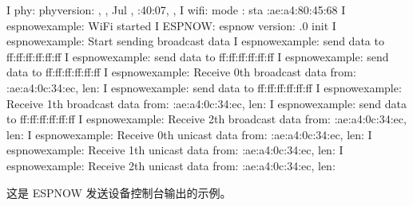 \documentclass[a4paper,12pt,english]{sphinxmanual}
\begin{document}
{{\begin{sphinxVerbatim}[commandchars=\\\{\}]
I  phy: phy\PYGZus{}version: , , Jul  , :40:07, , 
I  wifi: mode : sta :ae:a4:80:45:68
I  espnow\PYGZus{}example: WiFi started
I  ESPNOW: espnow \PYG{o}{[}version: .0\PYG{o}{]} init
I  espnow\PYGZus{}example: Start sending broadcast data
I  espnow\PYGZus{}example: send data to ff:ff:ff:ff:ff:ff
I  espnow\PYGZus{}example: send data to ff:ff:ff:ff:ff:ff
I  espnow\PYGZus{}example: send data to ff:ff:ff:ff:ff:ff
I  espnow\PYGZus{}example: Receive 0th broadcast data from: :ae:a4:0c:34:ec, len: 
I  espnow\PYGZus{}example: send data to ff:ff:ff:ff:ff:ff
I  espnow\PYGZus{}example: Receive 1th broadcast data from: :ae:a4:0c:34:ec, len: 
I  espnow\PYGZus{}example: send data to ff:ff:ff:ff:ff:ff
I  espnow\PYGZus{}example: Receive 2th broadcast data from: :ae:a4:0c:34:ec, len: 
I  espnow\PYGZus{}example: Receive 0th unicast data from: :ae:a4:0c:34:ec, len: 
I  espnow\PYGZus{}example: Receive 1th unicast data from: :ae:a4:0c:34:ec, len: 
I  espnow\PYGZus{}example: Receive 2th unicast data from: :ae:a4:0c:34:ec, len: 
\end{sphinxVerbatim}

\sphinxAtStartPar
这是 ESP\sphinxhyphen{}NOW 发送设备控制台输出的示例。

}}
\end{document}
